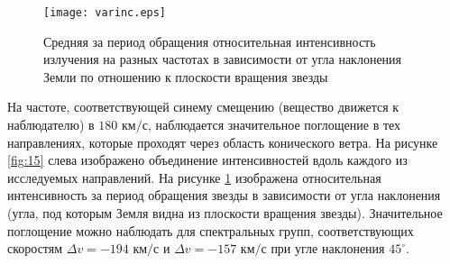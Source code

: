 \begin{figure}[ht!]
\centering
\texttt{[image: varinc.eps]}
\caption{Средняя за период обращения относительная интенсивность излучения на разных частотах в зависимости от угла наклонения Земли по отношению к плоскости вращения звезды}
\label{fig:16}
\end{figure}
На частоте, соответствующей синему смещению (вещество движется к наблюдателю) в $180 \text{ км/с}$, наблюдается значительное поглощение в тех направлениях, которые проходят через область конического ветра. На рисунке \ref{fig:15} слева изображено объединение интенсивностей вдоль каждого из исследуемых направлений. На рисунке \ref{fig:16} изображена относительная интенсивность за период обращения звезды в зависимости от угла наклонения (угла, под которым Земля видна из плоскости вращения звезды). Значительное поглощение можно наблюдать для спектральных групп, соответствующих скоростям $\Delta v = -194 \text{ км/с}$ и $\Delta v = -157 \text{ км/с}$ при угле наклонения $45^\circ$.